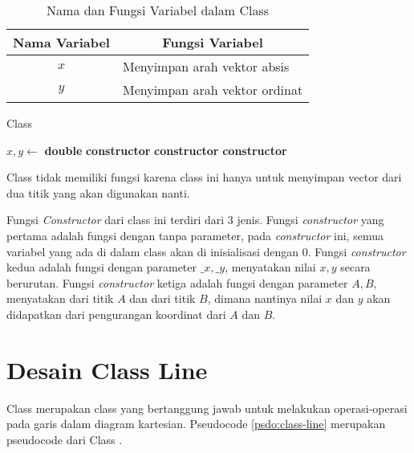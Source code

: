 \begin{table}[htb]
	\Centering
	\caption{Nama dan Fungsi Variabel dalam Class }
	\begin{tabular}{|c|p{7cm}|}
	\hline
	Nama Variabel & \multicolumn{1}{c|}{Fungsi Variabel}                               \\ \hline
$x$           & Menyimpan arah vektor absis  \\ \hline
$y$           & Menyimpan arah vektor ordinat          \\ \hline
	\end{tabular}
	\label{tab:var-vec}
\end{table}
\begin{algorithm}
	\caption{Class }
	\label{psdo:class-vec}
	\begin{algorithmic}[1]
        \State $ x, y \leftarrow $ \textbf{double}
		\State \textbf{constructor} 
        \State \textbf{constructor} 
        \State \textbf{constructor} 
	\end{algorithmic}
\end{algorithm}

Class  tidak memiliki fungsi karena class ini hanya untuk menyimpan vector dari dua titik yang akan digunakan nanti.

Fungsi \textit{Constructor} dari class ini terdiri dari 3 jenis. Fungsi \textit{constructor} yang pertama adalah fungsi dengan tanpa parameter, pada \textit{constructor} ini, semua variabel yang ada di dalam class  akan di inisialisasi dengan $0$. Fungsi \textit{constructor} kedua adalah fungsi dengan parameter $\_x, \_y$, menyatakan nilai $x, y$ secara berurutan. Fungsi \textit{constructor} ketiga adalah fungsi dengan parameter $A, B$, menyatakan  dari titik $A$ dan  dari titik $B$, dimana nantinya nilai $x$ dan $y$ akan didapatkan dari pengurangan koordinat dari  $A$ dan  $B$.

\section{ Desain Class Line}
\label{sec:line}
Class  merupakan class yang bertanggung jawab untuk melakukan operasi-operasi pada garis dalam diagram kartesian. Pseudocode \ref{psdo:class-line} merupakan pseudocode dari Class . 

